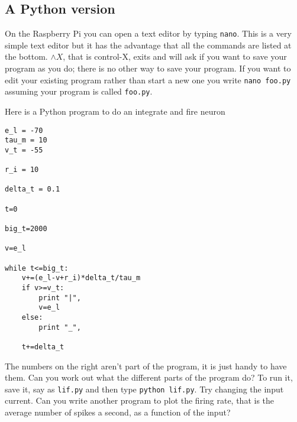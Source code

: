 \documentclass[11pt,a4paper]{scrartcl}
\begin{document}
\newpage

\subsection*{A Python version}

On the Raspberry Pi you can open a text editor by typing
\texttt{nano}. This is a very simple text editor but it has the
advantage that all the commands are listed at the bottom. $\wedge X$, that
is control-X, exits and will ask if you want to save your program as
you do; there is no other way to save your program. If you want to
edit your existing program rather than start a new one you write
\texttt{nano foo.py} assuming your program is called \texttt{foo.py}. 

Here is a Python program to do an integrate and fire neuron
\begin{lstlisting}[numbers=right]
e_l = -70
tau_m = 10
v_t = -55

r_i = 10

delta_t = 0.1

t=0

big_t=2000

v=e_l

while t<=big_t:
	v+=(e_l-v+r_i)*delta_t/tau_m
	if v>=v_t:
		print "|",
		v=e_l	
	else:
		print "_",

	t+=delta_t
\end{lstlisting}
The numbers on the right aren't part of the program, it is just handy
to have them. Can you work out what the different parts of the program do? To run it, save it, say as \texttt{lif.py} and then type \texttt{python lif.py}. Try changing the input current. Can you write another program to plot the firing rate, that is the average number of spikes a second, as a function of the input?
\end{document}
